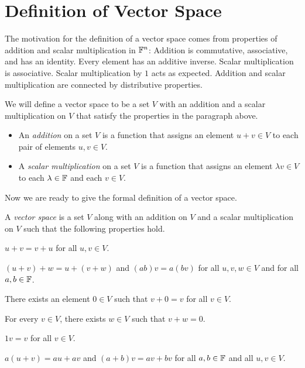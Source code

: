 \section{Definition of Vector Space}

The motivation for the definition of a vector space comes from properties of
addition and scalar multiplication in $\mathbb{F}^n$: Addition is commutative,
associative, and has an identity. Every element has an additive inverse. Scalar
multiplication is associative. Scalar multiplication by $1$ acts as expected.
Addition and scalar multiplication are connected by distributive properties.

We will define a vector space to be a set $V$ with an addition and a scalar
multiplication on $V$ that satisfy the properties in the paragraph above.

\begin{definition}\label{ax:1.19}\leavevmode
\begin{itemize}
\item An \emph{addition} on a set $V$ is a function that assigns an element
  $u+v\in V$ to each pair of elements $u,v\in V$.
\item A \emph{scalar multiplication} on a set $V$ is a function that assigns an
  element $\lambda v\in V$ to each $\lambda\in\mathbb{F}$ and each $v\in V$.
\end{itemize}
\end{definition}

Now we are ready to give the formal definition of a vector space.

\begin{definition}\label{ax:1.20}
A \emph{vector space} is a set $V$ along with an addition on $V$ and a scalar
multiplication on $V$ such that the following properties hold.
\begin{axprops}
\item[commutativity] $u+v=v+u$ for all $u,v\in V$.
\item[associativity] $(u+v)+w=u+(v+w)$ and $(ab)v=a(bv)$ for all
  $u,v,w\in V$ and for all $a,b\in\mathbb{F}$.
\item[additive identity] There exists an element $0\in V$ such that $v+0=v$
  for all $v\in V$.
\item[additive inverse] For every $v\in V$, there exists $w\in V$ such that
  $v+w=0$.
\item[multiplicative identity] $1v=v$ for all $v\in V$.
\item[distributive properties] $a(u+v)=au+av$ and $(a+b)v=av+bv$ for all
  $a,b\in\mathbb{F}$ and all $u,v\in V$.
\end{axprops}
\end{definition}

